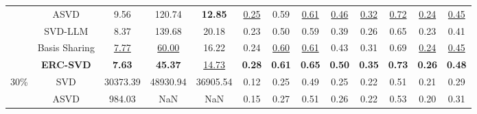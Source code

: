 \begin{table}[t]
{\begin{tabular}{c|c|ccc|cccccccc}
                               & \cellcolor{white} ASVD & \cellcolor{white} 9.56 & \cellcolor{white} 120.74 & \cellcolor{white} \textbf{12.85} & \cellcolor{white} \underline{0.25} & \cellcolor{white} 0.59 & \cellcolor{white} \underline{0.61} & \cellcolor{white} \underline{0.46} & \cellcolor{white} \underline{0.32} & \cellcolor{white} \underline{0.72} & \cellcolor{white} \underline{0.24} & \cellcolor{white} \underline{0.45}\\
              
                               & \cellcolor{white} SVD-LLM & \cellcolor{white} 8.37 & \cellcolor{white} 139.68 & \cellcolor{white} 20.18 & \cellcolor{white} 0.23 & \cellcolor{white} 0.50 & \cellcolor{white} 0.59 & \cellcolor{white} 0.39 & \cellcolor{white} 0.26 & \cellcolor{white} 0.65 & \cellcolor{white} 0.23 & \cellcolor{white} 0.41\\

                               & \cellcolor{white} Basis Sharing & \cellcolor{white} \underline{7.77} & \cellcolor{white} \underline{60.00} & \cellcolor{white} 16.22 & \cellcolor{white} 0.24 & \cellcolor{white} \underline{0.60} & \cellcolor{white} \underline{0.61} & \cellcolor{white} 0.43 & \cellcolor{white} 0.31 & \cellcolor{white} 0.69 & \cellcolor{white} \underline{0.24} &  \cellcolor{white} \underline{0.45} \\
        \cmidrule{2-13}      
                               & \cellcolor{cyan!10} \textbf{ERC-SVD} & \cellcolor{cyan!10} \textbf{7.63}  & \cellcolor{cyan!10} \textbf{45.37}  & \cellcolor{cyan!10} \underline{14.73} & \cellcolor{cyan!10} \textbf{0.28} & \cellcolor{cyan!10} \textbf{0.61} & \cellcolor{cyan!10} \textbf{0.65} & \cellcolor{cyan!10} \textbf{0.50} & \cellcolor{cyan!10} \textbf{0.35} & \cellcolor{cyan!10} \textbf{0.73} & \cellcolor{cyan!10} \textbf{0.26} & \cellcolor{cyan!10} \textbf{0.48} \\

    \midrule
        \multirow{5}{*}{30\%}  & \cellcolor{white} SVD & \cellcolor{white} 30373.39 & \cellcolor{white} 48930.94 & \cellcolor{white} 36905.54 & \cellcolor{white} 0.12 & \cellcolor{white} 0.25 & \cellcolor{white} 0.49 & \cellcolor{white} 0.25 & \cellcolor{white} 0.22 & \cellcolor{white} 0.51 & \cellcolor{white} 0.21 & \cellcolor{white} 0.29\\

                               & \cellcolor{white} ASVD & \cellcolor{white} 984.03 & \cellcolor{white} NaN & \cellcolor{white} NaN & \cellcolor{white} 0.15 & \cellcolor{white} 0.27 & \cellcolor{white} 0.51 & \cellcolor{white} 0.26 & \cellcolor{white} 0.22 & \cellcolor{white} 0.53 & \cellcolor{white} 0.20 & \cellcolor{white} 0.31\\
        

\end{tabular}}
\end{table}
